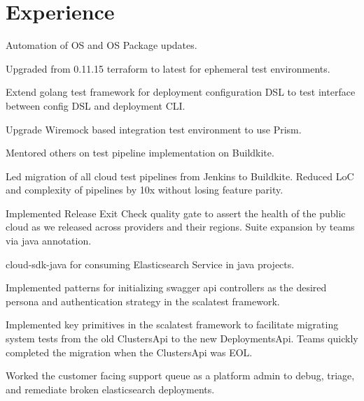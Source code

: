 \documentclass[letterpaper]{resume} %
\begin{document}
\begin{minipage}[t]{0.66\textwidth} %


\section{Experience}

\vspace{\topsep} %
\begin{tightitemize}
\item Automation of OS and OS Package updates.
\item Upgraded from 0.11.15 terraform to latest for ephemeral test environments.
\item Extend golang test framework for deployment configuration DSL to test interface between config DSL and deployment CLI.
\item Upgrade Wiremock based integration test environment to use Prism.
\item Mentored others on test pipeline implementation on Buildkite.
\item Led migration of all cloud test pipelines from Jenkins to Buildkite. Reduced LoC and complexity of pipelines by 10x without losing feature parity.
\item Implemented Release Exit Check quality gate to assert the health of the public cloud as we released across providers and their regions.  Suite expansion by teams via java annotation.
\item cloud-sdk-java for consuming Elasticsearch Service in java projects. 
\item Implemented patterns for initializing swagger api controllers as the desired persona and authentication strategy in the scalatest framework.
\item Implemented key primitives in the scalatest framework to facilitate migrating system tests from the old ClustersApi to the new DeploymentsApi.  Teams quickly completed the migration when the ClustersApi was EOL.
\item Worked the customer facing support queue as a platform admin to debug, triage, and remediate broken elasticsearch deployments.
\end{tightitemize}


\end{minipage}
\end{document}
